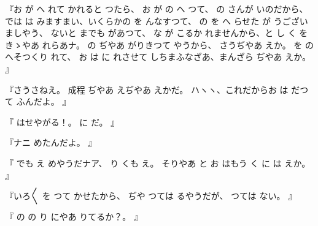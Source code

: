 『お
が
へ
れて
かれると
つたら、
お
が
の
へ
つて、
の
さんが
いのだから、
では
は
みますまい、いくらかの
を
んなすつて、
の
を
へ
らせた
が
うございましやう、
ないと
までも
があつて、
な
が
こるか
れませんから、と
し
く
をきゝやあ
れらあナ。
の
ぢやあ
がりきつて
やうから、
さうぢやあ
えか。
を
の
へそつくり
れて、
お
は
に
れさせて
しちまふなざあ、まんざら
ぢやあ
えか。
』

『さうさねえ。
成程
ぢやあ
えぢやあ
えかだ。
ハヽヽ、これだからお
は
だつて
ふんだよ。
』

『
はせやがる！。
に
だ。
』

『ナニ
めたんだよ。
』

『
でも
え
めやうだナア、
り
くも
え。
そりやあ
と
お
はもう
く
に
は
えか。
』

『いろ〳〵
を
つて
かせたから、
ぢや
つては
るやうだが、
つては
ない。
』

『
の
の
り
にやあ
りてるか？。
』

